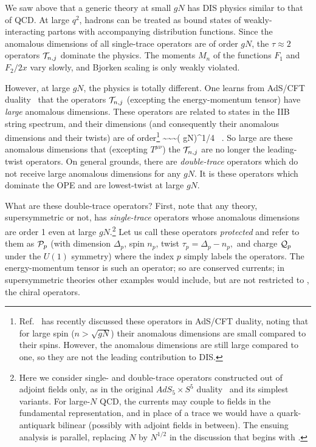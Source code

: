 We saw above that a generic theory at
small $g N$ has DIS physics similar
to that of QCD. At large $q^2$, hadrons can be treated
as bound states of weakly-interacting partons with accompanying
distribution functions.  Since the anomalous dimensions of all
single-trace operators are of order $g N$, the $\tau\approx 2$
operators ${\cal T}_{n,j}$ dominate the physics.  The moments $M_n$ of the
functions $F_1$ and $F_2/2x$ vary slowly, and Bjorken scaling is only
weakly violated.

However, at large $g N$, the physics is totally different.  One learns
from AdS/CFT duality~\cite{maldacon,GKPW} that the operators
${\cal T}_{n,j}$ (excepting the energy-momentum tensor) have {\it large}
anomalous dimensions.  These operators are related to states in the IIB string
spectrum, and their dimensions (and consequently their anomalous
dimensions and their twists) are of order\footnote
{Ref.~\cite{GKP2} has recently discussed these operators in AdS/CFT duality,
noting that for large spin ($n>\sqrt{gN}$)
their anomalous dimensions are small compared to
their spins.  However, the anomalous dimensions are still large compared to
one, so they are not the leading contribution to DIS.}   
%
\Delta \sim \tau\sim \gamma \sim ( gN)^{1/4} \ .
\ee
So large are these anomalous dimensions that (excepting $T^{\mu\nu}$)
the ${\cal T}_{n,j}$ are no longer the leading-twist operators. On general
grounds, there are {\it double-trace} operators which do not receive
large anomalous dimensions for any $g N$.  It is these operators which
dominate the OPE and are lowest-twist at large $g N$.

What are these double-trace operators?  First, note that any theory,
supersymmetric or not, has {\it single-trace} operators whose
anomalous dimensions are order 1 even at large $g N$.\footnote{Here
we consider single-
and double-trace operators constructed out of adjoint fields only, as
in the original $AdS_5 \times S^5$ duality~\cite{maldacon} and its simplest
variants.  For large-$N$ QCD, the currents may couple to fields in the
fundamental representation, and in place of a trace we would have a
quark-antiquark bilinear (possibly with adjoint fields in between).  The
ensuing analysis is parallel, replacing $N$ by $N^{1/2}$ in the discussion
that begins with .}  Let us call these operators {\it protected}
and refer to them as ${\cal P }_p$ (with dimension $\Delta_p$, spin $n_p$, twist
$\tau_p=\Delta_p-n_p,$ and charge ${\cal Q}_p$ under the $U(1)$ symmetry)
where the index $p$ simply labels the operators. The energy-momentum
tensor is such an operator; so are conserved currents; in
supersymmetric theories other examples would include, but are not
restricted to \cite{gubser}, the chiral operators.



